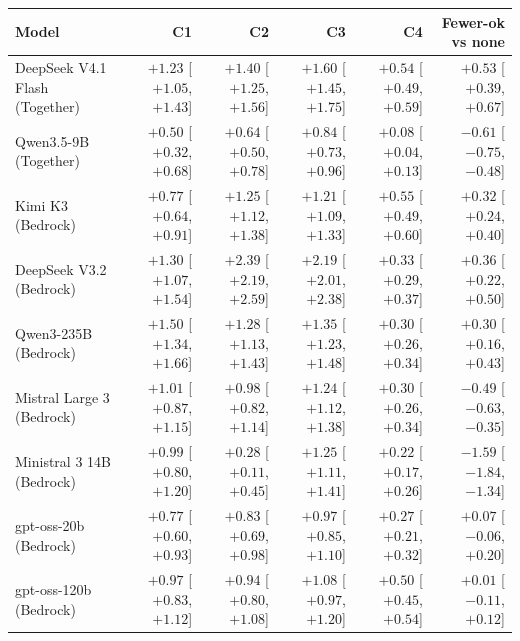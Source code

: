 \begin{tabular}{lrrrrr}
  \toprule
  Model & C1 & C2 & C3 & C4 & Fewer-ok vs none \\
  \midrule
  DeepSeek V4.1 Flash (Together) & $+1.23$ [$+1.05$, $+1.43$] & $+1.40$ [$+1.25$, $+1.56$] & $+1.60$ [$+1.45$, $+1.75$] & $+0.54$ [$+0.49$, $+0.59$] & $+0.53$ [$+0.39$, $+0.67$] \\
  Qwen3.5-9B (Together) & $+0.50$ [$+0.32$, $+0.68$] & $+0.64$ [$+0.50$, $+0.78$] & $+0.84$ [$+0.73$, $+0.96$] & $+0.08$ [$+0.04$, $+0.13$] & $-0.61$ [$-0.75$, $-0.48$] \\
  Kimi K3 (Bedrock) & $+0.77$ [$+0.64$, $+0.91$] & $+1.25$ [$+1.12$, $+1.38$] & $+1.21$ [$+1.09$, $+1.33$] & $+0.55$ [$+0.49$, $+0.60$] & $+0.32$ [$+0.24$, $+0.40$] \\
  DeepSeek V3.2 (Bedrock) & $+1.30$ [$+1.07$, $+1.54$] & $+2.39$ [$+2.19$, $+2.59$] & $+2.19$ [$+2.01$, $+2.38$] & $+0.33$ [$+0.29$, $+0.37$] & $+0.36$ [$+0.22$, $+0.50$] \\
  Qwen3-235B (Bedrock) & $+1.50$ [$+1.34$, $+1.66$] & $+1.28$ [$+1.13$, $+1.43$] & $+1.35$ [$+1.23$, $+1.48$] & $+0.30$ [$+0.26$, $+0.34$] & $+0.30$ [$+0.16$, $+0.43$] \\
  Mistral Large 3 (Bedrock) & $+1.01$ [$+0.87$, $+1.15$] & $+0.98$ [$+0.82$, $+1.14$] & $+1.24$ [$+1.12$, $+1.38$] & $+0.30$ [$+0.26$, $+0.34$] & $-0.49$ [$-0.63$, $-0.35$] \\
  Ministral 3 14B (Bedrock) & $+0.99$ [$+0.80$, $+1.20$] & $+0.28$ [$+0.11$, $+0.45$] & $+1.25$ [$+1.11$, $+1.41$] & $+0.22$ [$+0.17$, $+0.26$] & $-1.59$ [$-1.84$, $-1.34$] \\
  gpt-oss-20b (Bedrock) & $+0.77$ [$+0.60$, $+0.93$] & $+0.83$ [$+0.69$, $+0.98$] & $+0.97$ [$+0.85$, $+1.10$] & $+0.27$ [$+0.21$, $+0.32$] & $+0.07$ [$-0.06$, $+0.20$] \\
  gpt-oss-120b (Bedrock) & $+0.97$ [$+0.83$, $+1.12$] & $+0.94$ [$+0.80$, $+1.08$] & $+1.08$ [$+0.97$, $+1.20$] & $+0.50$ [$+0.45$, $+0.54$] & $+0.01$ [$-0.11$, $+0.12$] \\
  \bottomrule
\end{tabular}
